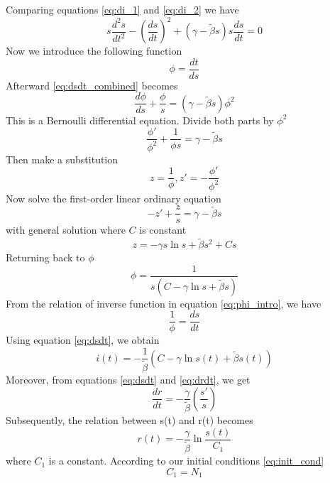 \documentclass[12pt, a4paper]{article}
\begin{document}
	Comparing equations \eqref{eq:di_1} and \eqref{eq:di_2} we have
	\begin{equation} \label{eq:dsdt_combined}
		s \frac{d^2 s}{dt^2} - (\frac{ds}{dt})^2 + (\gamma - \tilde{\beta} s) s \frac{ds}{dt} = 0
	\end{equation}
	Now we introduce the following function
	\begin{equation} \label{eq:phi_intro}
		\phi = \frac{dt}{ds}
	\end{equation}
	Afterward \eqref{eq:dsdt_combined} becomes
	\begin{equation}
		\frac{d \phi}{ds} + \frac{\phi}{s} = (\gamma - \tilde{\beta} s)\phi^2
	\end{equation}
	This is a Bernoulli differential equation. Divide both parts by $ \phi^2 $
	\begin{equation}
		\frac{\phi'}{\phi^2} + \frac{1}{\phi s} = \gamma - \tilde{\beta} s
	\end{equation}
	Then make a substitution
	\begin{equation}
		z = \frac{1}{\phi}, z' = -\frac{\phi'}{\phi^2}
	\end{equation}
	Now solve the first-order linear ordinary equation
	\begin{equation}
		-z' + \frac{z}{s} = \gamma - \tilde{\beta} s 
	\end{equation}
	with general solution where $C$ is constant
	\begin{equation}
		z = -\gamma s \ln{s} + \tilde{\beta} s^2 + Cs
	\end{equation}
	Returning back to $\phi$
	\begin{equation} \label{eq:phi_res}
		\phi = \frac{1}{s(C - \gamma \ln{s} + \tilde{\beta} s)}
	\end{equation}
	From the relation of inverse function in equation \eqref{eq:phi_intro}, we have
	\begin{equation}
		\frac{1}{\phi} = \frac{ds}{dt}
	\end{equation}
	Using equation \eqref{eq:dsdt}, we obtain
	\begin{equation} \label{eq:it_def}
		i(t) = -\frac{1}{\tilde{\beta}} (C - \gamma \ln{s(t)} + \tilde{\beta} s(t))
	\end{equation}
	Moreover, from equations \eqref{eq:dsdt} and \eqref{eq:drdt}, we get
	\begin{equation}
		\frac{dr}{dt} = -\frac{\gamma}{\tilde{\beta}} (\frac{s'}{s})
	\end{equation}
	Subsequently, the relation between s(t) and r(t) becomes
	\begin{equation} \label{eq:rt_def}
		r(t) = -\frac{\gamma}{\tilde{\beta}} \ln{\frac{s(t)}{C_1}}
	\end{equation}
	where $C_1$ is a constant. According to our initial conditions \eqref{eq:init_cond} 
	\begin{equation}
		C_1 = N_1
	\end{equation}
\end{document}
